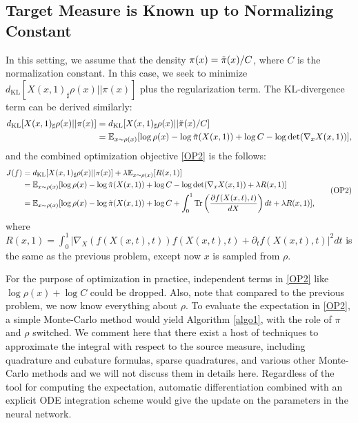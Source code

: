 \subsection{Target Measure is Known up to Normalizing Constant}
In this setting, we assume that the density $\pi(x) = \Tilde{\pi}(x)/C$, where $C$ is the normalization constant. In this case, we seek to minimize $d_\text{KL}[X(x,1)_\sharp\rho(x)||\pi(x)]$ plus the regularization term. The KL-divergence term can be derived similarly:
\begin{align*}
d_\text{KL}[X(x,1)_\sharp\rho(x)||\pi(x)] &=  d_\text{KL}[X(x,1)_\sharp\rho(x)||\Tilde{\pi}(x)/C] \\
&= \mathbb{E}_{x\sim\rho(x)}[\log\rho(x) - \log\Tilde{\pi}(X(x,1)) + \log C - \log\det(\nabla_x X(x,1))],
\end{align*}
and the combined optimization objective  \ref{OP2}  is the follows:
\begin{equation}\label{OP2}
\begin{aligned}
     J(f) &= d_\text{KL}[X(x,1)_\sharp\rho(x)||\pi(x)] + \lambda\mathbb{E}_{x\sim\rho(x)}[R(x,1)]\\
     &= \mathbb{E}_{x\sim\rho(x)}[\log\rho(x) - \log\Tilde{\pi}(X(x,1)) + \log C - \log\det(\nabla_x X(x,1)) + \lambda R(x,1)]\\
     &= \mathbb{E}_{x\sim\rho(x)}[\log\rho(x) - \log\Tilde{\pi}(X(x,1)) + \log C + \int_0^1\text{Tr}\left(\frac{\partial f(X(x,t),t)}{dX}\right)dt + \lambda R(x,1)],\\
\end{aligned}\tag{OP2}
\end{equation}
where $R(x,1) = \int_0^1  |\nabla_X(f(X(x,t),t))f(X(x,t),t) + \partial_tf(X(x,t),t)|^2dt$ is the same as the previous problem, except now $x$ is sampled from $\rho$.

For the purpose of optimization in practice, independent terms in \ref{OP2} like $\log\rho(x) + \log C$ could be dropped. Also, note that compared to the previous problem, we now know everything about $\rho$. To evaluate the expectation in \ref{OP2}, a simple Monte-Carlo method would yield Algorithm \ref{algo1}, with the role of $\pi$ and $\rho$ switched. We comment here that there exist a host of techniques to approximate the integral with respect to the source measure, including quadrature and cubature formulas, sparse quadratures, and various other Monte-Carlo methods and we will not discuss them in details here. Regardless of the tool for computing the expectation, automatic differentiation combined with an explicit ODE integration scheme would give the update on the parameters in the neural network. 

